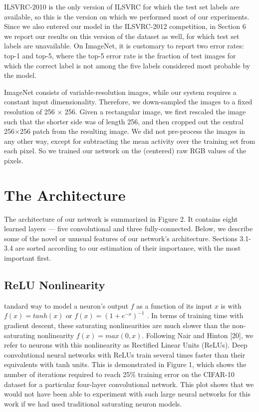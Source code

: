 \documentclass[12pt,a4paper,UTF8,twoside]{book}
\begin{document}
ILSVRC-2010 is the only version of ILSVRC for which the test set labels are available, so this is the version on which we performed most of our experiments. Since we also entered our model in the ILSVRC-2012 competition, in Section 6 we report our results on this version of the dataset as well, for which test set labels are unavailable. On ImageNet, it is customary to report two error rates: top-1 and top-5, where the top-5 error rate is the fraction of test images for which the correct label is not among the five labels considered most probable by the model.

ImageNet consists of variable-resolution images, while our system requires a constant input dimensionality. Therefore, we down-sampled the images to a fixed resolution of 256 × 256. Given a rectangular image, we first rescaled the image such that the shorter side was of length 256, and then cropped out the central 256×256 patch from the resulting image. We did not pre-process the images in any other way, except for subtracting the mean activity over the training set from each pixel. So we trained our network on the (centered) raw RGB values of the pixels.

\hypertarget{the-architecture}{%
\section{The Architecture}\label{the-architecture}}

The architecture of our network is summarized in Figure 2. It contains eight learned layers --- five convolutional and three fully-connected. Below, we describe some of the novel or unusual features of our network's architecture. Sections 3.1-3.4 are sorted according to our estimation of their importance, with the most important first.

\hypertarget{relu-nonlinearity}{%
\subsection{ReLU Nonlinearity}\label{relu-nonlinearity}}

tandard way to model a neuron's output \(f\) as a function of its input \(x\) is with \(f(x) = tanh(x)\) or \(f(x) = (1 + e^{−x} )^{−1}\) . In terms of training time with gradient descent, these saturating nonlinearities are much slower than the non-saturating nonlinearity \(f(x) = max(0, x)\). Following Nair and Hinton {[}20{]}, we refer to neurons with this nonlinearity as Rectified Linear Units (ReLUs). Deep convolutional neural networks with ReLUs train several times faster than their equivalents with tanh units. This is demonstrated in Figure 1, which shows the number of iterations required to reach 25\% training error on the CIFAR-10 dataset for a particular four-layer convolutional network. This plot shows that we would not have been able to experiment with such large neural networks for this work if we had used traditional saturating neuron models.
\end{document}
